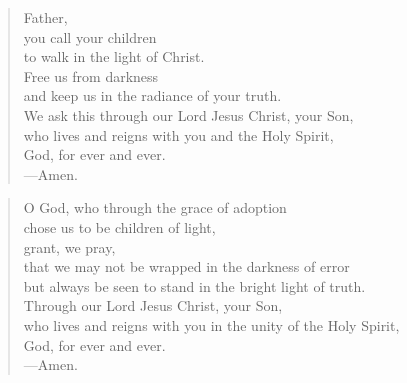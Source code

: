 \prayer

\setlength{\leftmargini}{\prayerleftmargini}

\begin{verse}
Father,\\
you call your children\\
to walk in the light of Christ.\\
Free us from darkness\\
and keep us in the radiance of your truth.\\
We ask this through our Lord Jesus Christ, your Son,\\
who lives and reigns with you and the Holy Spirit,\\
God, for ever and ever.\\
{\color{red}---\thinspace}Amen.
\end{verse}


\begin{verse}
O God, who through the grace of adoption\\
chose us to be children of light,\\
grant, we pray,\\
that we may not be wrapped in the darkness of error\\
but always be seen to stand in the bright light of truth.\\
Through our Lord Jesus Christ, your Son,\\
who lives and reigns with you in the unity of the Holy Spirit,\\
God, for ever and ever.\\
{\color{red}---\thinspace}Amen.
\end{verse}

\setlength{\leftmargini}{\defleftmargini}